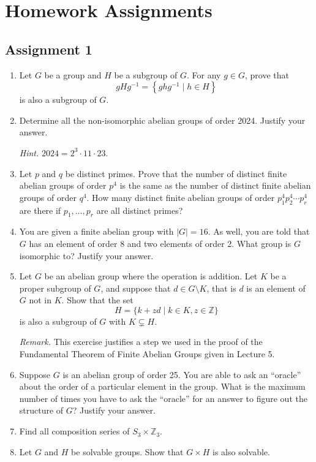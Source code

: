 \chapter*{Homework Assignments}

\section*{Assignment 1}

\begin{enumerate}[label={\sffamily\bfseries\color{main}\arabic*.}]
	\item Let $G$ be a group and $H$ be a subgroup of $G$. For any $g\in G$, prove that
	$$gHg^{-1}=\left\{ghg^{-1}\mid h\in H\right\}$$
	is also a subgroup of $G$.

	\item Determine all the non-isomorphic abelian groups of order 2024. Justify your answer.

	{\footnotesize\textit{\color{main}Hint.} $2024=2^3\cdot 11\cdot 23$.\par}

	\item Let $p$ and $q$ be distinct primes. Prove that the number of distinct finite abelian groups of order $p^4$ is the same as the number of distinct finite abelian groups of order $q^4$. How many distinct finite abelian groups of order $p_1^4p_2^4\cdots p_r^4$ are there if $p_1,\hdots,p_r$ are all distinct primes?

	\item You are given a finite abelian group with $|G|=16$. As well, you are told that $G$ has an element of order 8 and two elements of order 2. What group is $G$ isomorphic to? Justify your answer.

	\item Let $G$ be an abelian group where the operation is addition. Let $K$ be a proper subgroup of $G$, and suppose that $d\in G\setminus K$, that is $d$ is an element of $G$ not in $K$. Show that the set
	$$H=\{k+zd\mid k\in K,z\in\mathbb Z\}$$
	is also a subgroup of $G$ with $K\subsetneq H$.

	{\footnotesize\textit{\color{main}Remark.} This exercise justifies a step we used in the proof of the Fundamental Theorem of Finite Abelian Groups given in Lecture 5.\par}

	\item Suppose $G$ is an abelian group of order 25. You are able to ask an ``oracle'' about the order of a particular element in the group. What is the maximum number of times you have to ask the ``oracle'' for an answer to figure out the structure of $G$? Justify your answer.

	\item Find all composition series of $S_3\times\mathbb Z_3$.

	\item Let $G$ and $H$ be solvable groups. Show that $G\times H$ is also solvable.
\end{enumerate}

